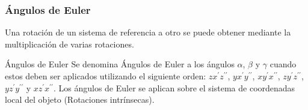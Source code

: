 \begin{frame}
    \frametitle{Ángulos de Euler}
    \scriptsize


    Una rotación de un sistema de referencia a otro se puede obtener mediante la multiplicación de varias rotaciones.
    
    \begin{block}{Ángulos de Euler}
        Se denomina Ángulos de Euler a los ángulos $\alpha$, $\beta$ y $\gamma$ cuando estos deben ser aplicados utilizando el siguiente orden: $zx^{\prime}z^{\prime\prime}$, $yx^{\prime}y^{\prime\prime}$, $xy^{\prime}x^{\prime\prime}$, $zy^{\prime}z^{\prime\prime}$, $yz^{\prime}y^{\prime\prime}$ y $xz^{\prime}x^{\prime\prime}$. Los ángulos de Euler se aplican sobre el sistema de coordenadas local del objeto (Rotaciones intrínsecas).
    \end{block}
   

\end{frame}
